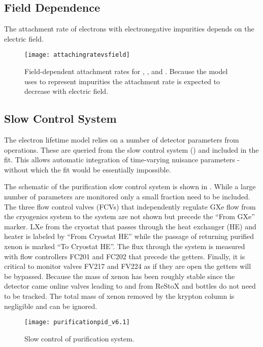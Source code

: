 {\subsection{Field Dependence}
\label{subsec:electron_lifetime_model_field}
The attachment rate of electrons with electronegative impurities depends on the electric field.

\begin{figure}
\centering
\texttt{[image: attachingratevsfield]}
\caption{Field-dependent attachment rates for , , and .  Because the model uses  to represent
impurities the attachment rate is expected to decrease with electric field.}
\label{fig:electron_lifetime_model_field_attaching_rate}
\end{figure}



\subsection{Slow Control System}
\label{subsec:electron_lifetime_model_slow_control}
The electron lifetime model relies on a number of detector parameters from operations.  These are queried from the slow control system
() and included in the fit.  This allows automatic integration of time-varying nuisance
parameters - without which the fit would be essentially impossible.

The schematic of the purification slow control system is shown in .  While a large
number of parameters are monitored only a small fraction need to be included.  The three flow control valves (FCVs) that independently
regulate GXe flow from the cryogenics system to the system are not shown but precede the ``From GXe'' marker.  LXe from the cryostat that
passes
through the heat exchanger (HE) and heater is labeled by ``From Cryostat HE'' while the passage of returning purified xenon is marked
``To Cryostat HE''.  The flux through the system is
measured with flow controllers FC201 and FC202 that precede the getters.  Finally, it is critical to monitor valves FV217 and FV224 as
if they are open the getters will be bypassed.  Because the mass of xenon has been roughly stable since the detector came online valves
leading to and from ReStoX and bottles do not need to be tracked.  The total mass of xenon removed by the krypton column is negligible and
can be ignored.

\begin{figure}
\centering
\texttt{[image: purificationpid\_v6.1]}
\caption{Slow control of purification system.}
\label{fig:electron_lifetime_model_slow_control_pur}
\end{figure}

}
